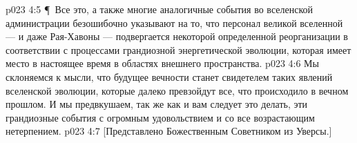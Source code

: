 \vs p023 4:5 \P\ Все это, а также многие аналогичные события во вселенской администрации безошибочно указывают на то, что персонал великой вселенной --- и даже Рая\hyp{}Хавоны --- подвергается некоторой определенной реорганизации в соответствии с процессами грандиозной энергетической эволюции, которая имеет место в настоящее время в областях внешнего пространства.
\vs p023 4:6 Мы склоняемся к мысли, что будущее вечности станет свидетелем таких явлений вселенской эволюции, которые далеко превзойдут все, что происходило в вечном прошлом. И мы предвкушаем, так же как и вам следует это делать, эти грандиозные события с огромным удовольствием и со все возрастающим нетерпением.
\vs p023 4:7 [Представлено Божественным Советником из Уверсы.]

